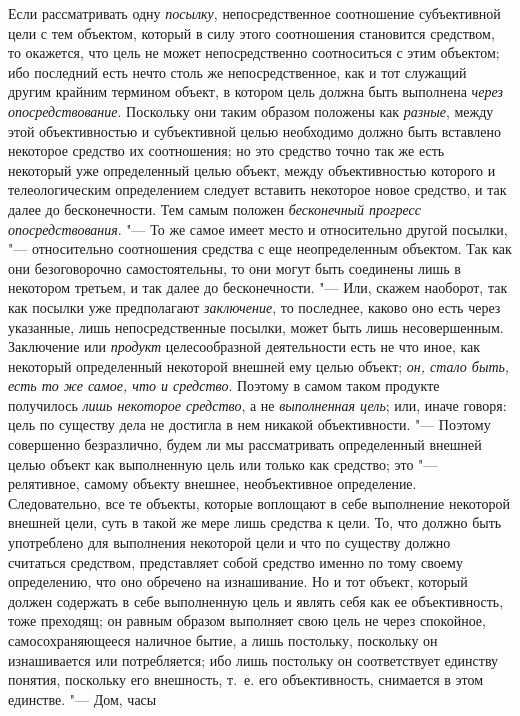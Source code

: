 Если рассматривать одну
{\em посылку},
непосредственное соотношение субъективной цели с тем
объектом, который в силу этого соотношения становится средством, то
окажется, что цель не может непосредственно соотноситься с этим объектом;
ибо последний есть нечто столь же непосредственное, как и тот служащий
другим крайним термином объект, в котором цель должна быть выполнена
{\em через опосредствование}.
Поскольку они таким образом положены как
{\em разные}, между этой
объективностью и субъективной целью необходимо должно быть вставлено
некоторое средство их соотношения; но это средство точно так же есть
некоторый уже определенный целью объект, между объективностью которого и
телеологическим определением следует вставить некоторое новое средство, и
так далее до бесконечности. Тем самым положен
{\em бесконечный прогресс}
{\em опосредствования}. "---
То же самое имеет место и относительно другой
посылки, "--- относительно соотношения средства с еще
неопределенным объектом. Так как они безоговорочно самостоятельны, то они
могут быть соединены лишь в некотором третьем, и так далее до
бесконечности. "--- Или, скажем наоборот, так как посылки уже
предполагают {\em заключение},
то последнее, каково оно есть через указанные, лишь
непосредственные посылки, может быть лишь несовершенным. Заключение или
{\em продукт}
целесообразной деятельности есть не что иное, как некоторый
определенный некоторой внешней ему целью объект;
{\em он, стало быть, есть то же самое,
что и средство}. Поэтому в самом таком продукте получилось
{\em лишь некоторое средство},
а не {\em выполненная
цель}; или, иначе говоря: цель по существу дела не достигла
в нем никакой объективности. "--- Поэтому совершенно
безразлично, будем ли мы рассматривать определенный внешней целью объект
как выполненную цель или только как средство; это
"--- релятивное, самому объекту внешнее, необъективное
определение. Следовательно, все те объекты, которые воплощают в себе
выполнение некоторой внешней цели, суть в такой же мере лишь средства к
цели. То, что должно быть употреблено для выполнения некоторой цели и что
по существу должно считаться средством, представляет собой средство именно
по тому своему определению, что оно обречено на изнашивание. Но и тот
объект, который должен содержать в себе выполненную цель и являть себя как
ее объективность, тоже преходящ; он равным образом выполняет свою цель не
через спокойное, самосохраняющееся наличное бытие, а лишь постольку,
поскольку он изнашивается или потребляется; ибо лишь постольку он
соответствует единству понятия, поскольку его внешность, т.~е. его
объективность, снимается в этом единстве. "--- Дом, часы
